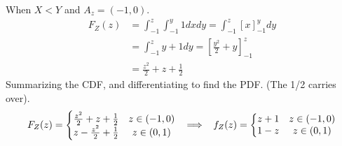 When $X < Y$ and $A_z = (-1, 0)$.
\begin{align*}
    F_Z(z) &= \int_{-1}^z\int_{-1}^y 1 dxdy = \int_{-1}^z[x]_{-1}^y dy \\
    &= \int_{-1}^z y + 1 dy = \left[\frac{y^2}{2} + y\right]_{-1}^z \\
    &= \frac{z^2}{2} + z + \frac{1}{2} 
\end{align*}
Summarizing the CDF, and differentiating to find the PDF. (The 1/2 carries over).
$$
F_Z(z) =
\left\{
    \begin{matrix}
        \frac{z^2}{2} + z + \frac{1}{2} & z\in(-1, 0) \\
        z - \frac{z^2}{2} + \frac{1}{2} & z\in(0, 1) 
    \end{matrix}
\right.
\;\;\implies\;\;
f_Z(z) =
\left\{
    \begin{matrix}
        z + 1 & z\in(-1, 0) \\
        1 - z & z\in(0, 1) 
    \end{matrix}
\right.
$$
